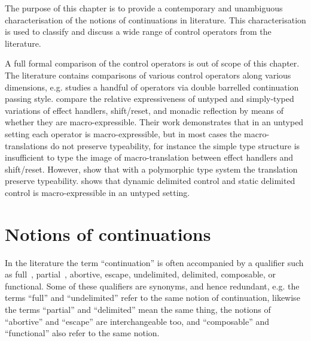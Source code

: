 \documentclass[12pt,phd,lfcs,twoside,openright,logo,leftchapter,normalheadings]{infthesis}
\theoremstyle{plain}
\theoremstyle{definition}
\begin{document}
The purpose of this chapter is to provide a contemporary and
unambiguous characterisation of the notions of continuations in
literature. This characterisation is used to classify and discuss a
wide range of control operators from the literature.


A full formal comparison of the control operators is out of scope of
this chapter. The literature contains comparisons of various control
operators along various dimensions, e.g.
%
\citet{Thielecke02} studies a handful of operators via double
barrelled continuation passing style. \citet{ForsterKLP19} compare the
relative expressiveness of untyped and simply-typed variations of
effect handlers, shift/reset, and monadic reflection by means of
whether they are macro-expressible. Their work demonstrates that in an
untyped setting each operator is macro-expressible, but in most cases
the macro-translations do not preserve typeability, for instance the
simple type structure is insufficient to type the image of
macro-translation between effect handlers and shift/reset.
%
However, \citet{PirogPS19} show that with a polymorphic type system
the translation preserve typeability.
%
\citet{Shan04} shows that dynamic delimited control and static
delimited control is macro-expressible in an untyped setting.

\section{Notions of continuations}


In the literature the term ``continuation'' is often accompanied by a
qualifier such as full~\cite{JohnsonD88}, partial~\cite{JohnsonD88},
abortive, escape, undelimited, delimited, composable, or functional.
%
Some of these qualifiers are synonyms, and hence redundant, e.g. the
terms ``full'' and ``undelimited'' refer to the same notion of
continuation, likewise the terms ``partial'' and ``delimited'' mean
the same thing, the notions of ``abortive'' and ``escape'' are
interchangeable too, and ``composable'' and ``functional'' also refer
to the same notion.
%
\end{document}
